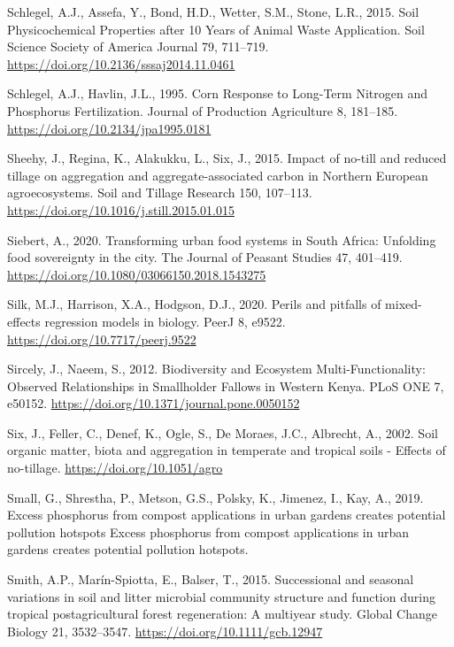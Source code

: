 \documentclass[
  12pt,
]{article}
\newlength{\cslhangindent}
\newlength{\cslentryspacingunit} %
\newenvironment{CSLReferences}[2] %
 {%
  \setlength{\parindent}{0pt}
  \ifodd #1
  \let\oldpar\par
  \def\par{\hangindent=\cslhangindent\oldpar}
  \fi
  \setlength{\parskip}{#2\cslentryspacingunit}
 }%
 {}
\begin{document}
\begin{CSLReferences}{1}{0}
\leavevmode{}%
Schlegel, A.J., Assefa, Y., Bond, H.D., Wetter, S.M., Stone, L.R., 2015. Soil {Physicochemical Properties} after 10 {Years} of {Animal Waste Application}. Soil Science Society of America Journal 79, 711--719. \url{https://doi.org/10.2136/sssaj2014.11.0461}

\leavevmode{}%
Schlegel, A.J., Havlin, J.L., 1995. Corn {Response} to {Long-Term Nitrogen} and {Phosphorus Fertilization}. Journal of Production Agriculture 8, 181--185. \url{https://doi.org/10.2134/jpa1995.0181}

\leavevmode{}%
Sheehy, J., Regina, K., Alakukku, L., Six, J., 2015. Impact of no-till and reduced tillage on aggregation and aggregate-associated carbon in {Northern European} agroecosystems. Soil and Tillage Research 150, 107--113. \url{https://doi.org/10.1016/j.still.2015.01.015}

\leavevmode{}%
Siebert, A., 2020. Transforming urban food systems in {South Africa}: Unfolding food sovereignty in the city. The Journal of Peasant Studies 47, 401--419. \url{https://doi.org/10.1080/03066150.2018.1543275}

\leavevmode{}%
Silk, M.J., Harrison, X.A., Hodgson, D.J., 2020. Perils and pitfalls of mixed-effects regression models in biology. PeerJ 8, e9522. \url{https://doi.org/10.7717/peerj.9522}

\leavevmode{}%
Sircely, J., Naeem, S., 2012. Biodiversity and {Ecosystem Multi-Functionality}: {Observed Relationships} in {Smallholder Fallows} in {Western Kenya}. PLoS ONE 7, e50152. \url{https://doi.org/10.1371/journal.pone.0050152}

\leavevmode{}%
Six, J., Feller, C., Denef, K., Ogle, S., De Moraes, J.C., Albrecht, A., 2002. Soil organic matter, biota and aggregation in temperate and tropical soils - {Effects} of no-tillage. \url{https://doi.org/10.1051/agro}

\leavevmode{}%
Small, G., Shrestha, P., Metson, G.S., Polsky, K., Jimenez, I., Kay, A., 2019. Excess phosphorus from compost applications in urban gardens creates potential pollution hotspots {Excess} phosphorus from compost applications in urban gardens creates potential pollution hotspots.

\leavevmode{}%
Smith, A.P., Marín-Spiotta, E., Balser, T., 2015. Successional and seasonal variations in soil and litter microbial community structure and function during tropical postagricultural forest regeneration: {A} multiyear study. Global Change Biology 21, 3532--3547. \url{https://doi.org/10.1111/gcb.12947}


\end{CSLReferences}
\end{document}

